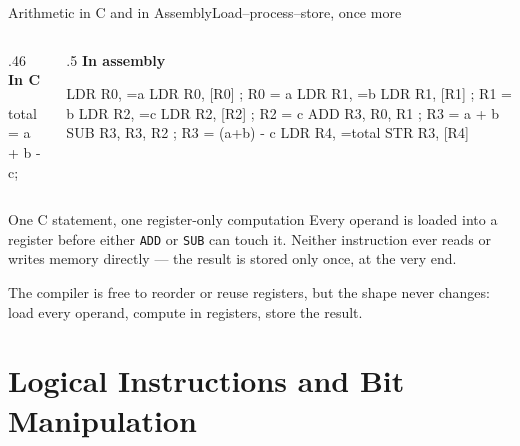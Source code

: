 \documentclass[9pt,aspectratio=169,xcolor=table]{beamer}
\begin{document}
\begin{frame}[fragile]{Arithmetic in C and in Assembly}{Load--process--store, once more}
    \begin{columns}[T]
    \begin{column}{.46\textwidth}
        \textbf{In C}

        \vspace{1mm}
        \begin{cc}
total = a + b - c;
        \end{cc}
    \end{column}
    \begin{column}{.5\textwidth}
        \textbf{In assembly}

        \vspace{1mm}
        \begin{asm}
	LDR  R0, =a
	LDR  R0, [R0]   ; R0 = a
	LDR  R1, =b
	LDR  R1, [R1]   ; R1 = b
	LDR  R2, =c
	LDR  R2, [R2]   ; R2 = c
	ADD  R3, R0, R1 ; R3 = a + b
	SUB  R3, R3, R2 ; R3 = (a+b) - c
	LDR  R4, =total
	STR  R3, [R4]
        \end{asm}
    \end{column}
    \end{columns}

    \vspace{1.5mm}
    \begin{block}{One C statement, one register-only computation}
        Every operand is \alert{loaded} into a register before either
        \texttt{ADD} or \texttt{SUB} can touch it. Neither instruction
        ever reads or writes memory directly --- the result is
        \alert{stored} only once, at the very end.
    \end{block}

    \vspace{1mm}
    {\small The compiler is free to reorder or reuse registers, but the
    shape never changes: \alert{load every operand, compute in
    registers, store the result.}}
\end{frame}


\section{Logical Instructions and Bit Manipulation}
\end{document}
